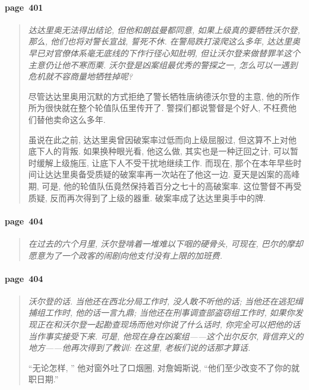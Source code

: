 \paragraph*{page~401}
\begin{quotation}
    \itshape
    达达里奥无法得出结论, 但他和朗兹曼都同意, 如果上级真的要牺牲沃尔登, 那么, 他们也将对警长宣战, 誓死不休. 在警局跌打滚爬这么多年, 达达里奥早已对官僚体系毫无底线的下作行径心知肚明, 但让沃尔登来做替罪羊这个主意仍让他不寒而栗. 沃尔登是凶案组最优秀的警探之一, 怎么可以一遇到危机就不容商量地牺牲掉呢? 

    尽管达达里奥用沉默的方式拒绝了警长牺牲唐纳德沃尔登的主意, 他的所作所为很快就在整个轮值队伍里传开了. 警探们都说警督是个好人, 不枉费他们替他卖命这么多年. 

    虽说在此之前, 达达里奥曾因破案率过低而向上级屈服过, 但这算不上对他底下人的背叛. 如果换种眼光看, 他这么做, 其实也是一种迂回之计, 可以暂时缓解上级施压, 让底下人不受干扰地继续工作. 而现在, 那个在本年早些时间让达达里奥备受质疑的破案率再一次站在了他这一边. 夏天是凶案的高峰期, 可是, 他的轮值队伍竟然保持着百分之七十的高破案率. 这位警督不再受质疑, 反而再次得到了上级的器重. 破案率成了达达里奥手中的牌. 
\end{quotation}

\paragraph*{page~404}
\begin{quotation}
    \itshape
    在过去的六个月里, 沃尔登啃着一堆难以下咽的硬骨头, 可现在, 巴尔的摩却愿意为了一个政客的闹剧向他支付没有上限的加班费. 
\end{quotation}

\paragraph*{page~404}
\begin{quotation}
    \itshape
    沃尔登的话. 当他还在西北分局工作时, 没人敢不听他的话; 当他还在逃犯缉捕组工作时, 他的话一言九鼎; 当他还在刑事调查部盗窃组工作时, 如果你发现正在和沃尔登一起勘查现场而他对你说了什么话时, 你完全可以把他的话当作事实接受下来. 可是, 他现在身在凶案组------这个出尔反尔, 背信弃义的地方------他再次得到了教训: 在这里, 老板们说的话那才算话. 

    ``无论怎样, '' 他对窗外吐了口烟圈, 对詹姆斯说, ``他们至少改变不了你的就职日期.''
\end{quotation}



